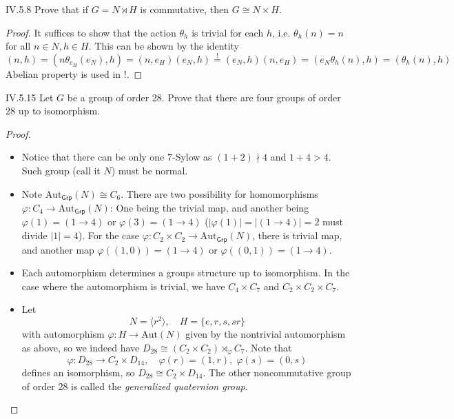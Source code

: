 \begin{problem}{IV.5.8}
Prove that if $G = N \rtimes H$ is commutative, then $G \cong N \times H$.
\end{problem}
\begin{proof}
It suffices to show that the action $\theta_h$ is trivial for each $h$, i.e. $\theta_h(n) = n$ for all $n \in N, h \in H$. This can be shown by the identity
\[
(n,h) = (n\theta_{e_H}(e_N), h) = (n,e_H)(e_N,h) \overset{!}{=} (e_N,h)(n,e_H) = (e_N\theta_h(n), h) = (\theta_h(n), h)
\]
Abelian property is used in !.
\end{proof}

\begin{problem}{IV.5.15}
Let $G$ be a group of order 28. Prove that there are four groups of order 28 up to isomorphism.
\end{problem}
\begin{proof}\
\begin{itemize} 
	\setlength\itemsep{0pt}
	\item Notice that there can be only one $7$-Sylow as $(1+2)\nmid 4$ and $1 + 4 > 4$. Such group (call it $N$) must be normal.
	\item Note $\text{Aut}_\mathsf{Grp}(N) \cong C_6 $. There are two possibility for homomorphisms $\varphi : C_4 \to \text{Aut}_\mathsf{Grp}(N)$: One being the trivial map, and another being $\varphi(1) = (1 \to 4)$ or $\varphi(3) = (1 \to 4)$ ($|\varphi(1)| = |(1 \to 4)| = 2$ must divide $|1| = 4$). For the case $\varphi : C_2 \times C_2 \to \text{Aut}_\mathsf{Grp}(N)$, there is trivial map, and another map $\varphi((1,0)) = (1 \to 4)$ or $\varphi((0,1)) = (1 \to 4)$.
	\item Each automorphism determines a groups structure up to isomorphism. In the case where the automorphism is trivial, we have $C_4 \times C_7$ and $C_2 \times C_2 \times C_7$.
	\item Let
	\[
	N = \langle r^2 \rangle, \quad H = \{e,r,s,sr\}	
	\]
	with automorphism $\varphi: H \to \text{Aut}(N)$ given by the nontrivial automorphism as above, so we indeed have $D_{28} \cong (C_2 \times C_2) \rtimes_\varphi C_7$. Note that
	\[
	\varphi: D_{28} \to C_2 \times D_{14}, \quad \varphi(r) = (1,r), \;\varphi(s) = (0,s)
	\]
	defines an isomorphism, so $D_{28} \cong C_2 \times D_{14}$. The other noncommutative group of order 28 is called the \emph{generalized quaternion group}.
\end{itemize}
\end{proof}

\section{}

